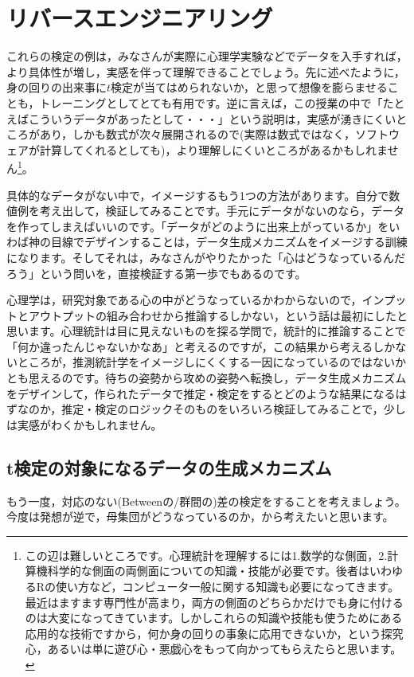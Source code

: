 \documentclass{ltjsarticle}
\begin{document}
{\section{リバースエンジニアリング}
これらの検定の例は，みなさんが実際に心理学実験などでデータを入手すれば，より具体性が増し，実感を伴って理解できることでしょう。先に述べたように，身の回りの出来事に$t$検定が当てはめられないか，と思って想像を膨らませることも，トレーニングとしてとても有用です。逆に言えば，この授業の中で「たとえばこういうデータがあったとして・・・」という説明は，実感が湧きにくいところがあり，しかも数式が次々展開されるので(実際は数式ではなく，ソフトウェアが計算してくれるとしても)，より理解しにくいところがあるかもしれません\footnote{この辺は難しいところです。心理統計を理解するには1.数学的な側面，2.計算機科学的な側面の両側面についての知識・技能が必要です。後者はいわゆるRの使い方など，コンピュータ一般に関する知識も必要になってきます。最近はますます専門性が高まり，両方の側面のどちらかだけでも身に付けるのは大変になってきています。しかしこれらの知識や技能も使うためにある応用的な技術ですから，何か身の回りの事象に応用できないか，という探究心，あるいは単に遊び心・悪戯心をもって向かってもらえたらと思います。}。

具体的なデータがない中で，イメージするもう1つの方法があります。自分で数値例を考え出して，検証してみることです。手元にデータがないのなら，データを作ってしまえばいいのです。「データがどのように出来上がっているか」をいわば神の目線でデザインすることは，データ生成メカニズムをイメージする訓練になります。そしてそれは，みなさんがやりたかった「心はどうなっているんだろう」という問いを，直接検証する第一歩でもあるのです。

心理学は，研究対象である心の中がどうなっているかわからないので，インプットとアウトプットの組み合わせから推論するしかない，という話は最初にしたと思います。心理統計は目に見えないものを探る学問で，統計的に推論することで「何か違ったんじゃないかなあ」と考えるのですが，この結果から考えるしかないところが，推測統計学をイメージしにくくする一因になっているのではないかとも思えるのです。待ちの姿勢から攻めの姿勢へ転換し，データ生成メカニズムをデザインして，作られたデータで推定・検定をするとどのような結果になるはずなのか，推定・検定のロジックそのものをいろいろ検証してみることで，少しは実感がわくかもしれません。

\subsection{t検定の対象になるデータの生成メカニズム}
もう一度，対応のない(Betweenの/群間の)差の検定をすることを考えましょう。今度は発想が逆で，母集団がどうなっているのか，から考えたいと思います。

}
\end{document}
